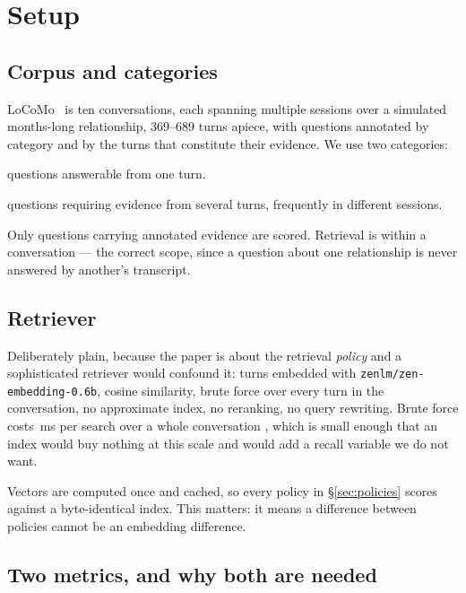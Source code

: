 \section{Setup}
\label{sec:setup}

\subsection{Corpus and categories}

LoCoMo~\cite{locomo} is ten conversations, each spanning multiple sessions over
a simulated months-long relationship, 369--689 turns apiece, with questions
annotated by category and by the turns that constitute their evidence. We use
two categories:

\begin{description}[leftmargin=1.2cm,style=nextline]
\item[Category 4, single-hop] \rQsingle{} questions answerable from one turn.
\item[Category 1, multi-hop] \rQmulti{} questions requiring evidence from several
  turns, frequently in different sessions.
\end{description}

Only questions carrying annotated evidence are scored. Retrieval is within a
conversation --- the correct scope, since a question about one relationship is
never answered by another's transcript.

\subsection{Retriever}

Deliberately plain, because the paper is about the retrieval \emph{policy} and a
sophisticated retriever would confound it: turns embedded with
\texttt{zenlm/zen-embedding-0.6b}, cosine similarity, brute force over every turn
in the conversation, no approximate index, no reranking, no query rewriting.
Brute force costs \rSearchMs{}\,ms per search over a whole conversation \meas{},
which is small enough that an index would buy nothing at this scale and would add
a recall variable we do not want.

Vectors are computed once and cached, so every policy in \S\ref{sec:policies}
scores against a byte-identical index. This matters: it means a difference
between policies cannot be an embedding difference.

\subsection{Two metrics, and why both are needed}

